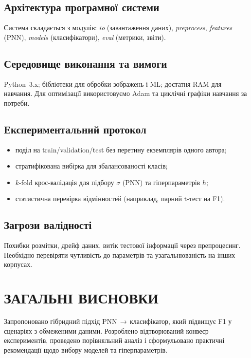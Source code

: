 \documentclass{article}
\begin{document}
\subsection{Архітектура програмної системи}
Система складається з модулів: \textit{io} (завантаження даних), \textit{preprocess},
\textit{features} (PNN), \textit{models} (класифікатори), \textit{eval} (метрики, звіти).

\subsection{Середовище виконання та вимоги}
Python~3.x; бібліотеки для обробки зображень і ML; достатня RAM для навчання.
Для оптимізації використовуємо Adam \cite{kingma2014adam} та циклічні графіки навчання за потреби.

\subsection{Експериментальний протокол}
\begin{itemize}
  \item поділ на train/validation/test без перетину екземплярів одного автора;
  \item стратифікована вибірка для збалансованості класів;
  \item $k$-fold крос-валідація для підбору $\sigma$ (PNN) та гіперпараметрів $h$;
  \item статистична перевірка відмінностей (наприклад, парний t-тест на F1).
\end{itemize}

\subsection{Загрози валідності}
Похибки розмітки, дрейф даних, витік тестової інформації через препроцесинг. Необхідно
перевіряти чутливість до параметрів та узагальнюваність на інших корпусах.

\section*{ЗАГАЛЬНІ ВИСНОВКИ}
Запропоновано гібридний підхід PNN\,$\to$\,класифікатор, який підвищує F1 у сценаріях з
обмеженими даними. Розроблено відтворюваний конвеєр експериментів, проведено
порівняльний аналіз і сформульовано практичні рекомендації щодо вибору моделей та
гіперпараметрів.
\end{document}
